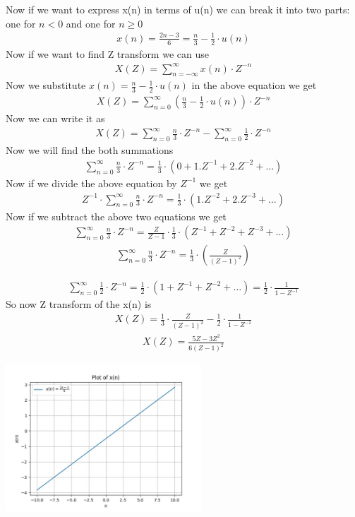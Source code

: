 \documentclass[journal,12pt,twocolumn]{IEEEtran}
\theoremstyle{remark}
\begin{document}
Now if we want to express x(n) in terms of u(n) we can break it into two parts: one for $n < 0 $ and one for $ n \ge 0$  
\begin{align} x(n) = \frac{2n-3}{6} = \frac{n}{3} - \frac{1}{2} \cdot u(n) \end{align}
\bigskip
Now if we want to find Z transform we can use
\begin{align} X(Z) = \sum_{n = -\infty}^{\infty} x(n) \cdot Z^{-n} \end{align}
\bigskip
Now we substitute 
$x(n) = \frac{n}{3} - \frac{1}{2} \cdot u(n)$ in the above equation we get
\begin{align} X(Z) = \sum_{n = 0}^{\infty} (\frac{n}{3} - \frac{1}{2} \cdot u(n) )\cdot Z^{-n} \end{align}
\bigskip
Now we can write it as 
\begin{align} X(Z) = \sum_{n=0}^{\infty} \frac{n}{3} \cdot Z^{-n} - \sum_{n=0}^{\infty} \frac{1}{2} \cdot Z^{-n} \end{align}
\bigskip
Now we will find the both summations 
\begin{align} \sum_{n=0}^{\infty} \frac{n}{3} \cdot Z^{-n} = \frac{1}{3} \cdot (0 + 1.Z^{-1} + 2.Z^{-2} + \ldots) \end{align}
\bigskip
Now if we divide the above equation by $Z^{-1}$ we get 
\begin{align} Z^{-1} \cdot \sum_{n=0}^{\infty} \frac{n}{3} \cdot Z^{-n} =\frac{1}{3} \cdot (1.Z^{-2} + 2.Z^{-3} + \ldots ) \end{align}
\bigskip
Now if we subtract the above two equations we get 
\begin{align} \sum_{n=0}^{\infty} \frac{n}{3} \cdot Z^{-n} = \frac{Z}{Z-1} \cdot \frac{1}{3} \cdot (Z^{-1} + Z^{-2} + Z^{-3} + \ldots) \end{align}
\begin{align} \sum_{n=0}^{\infty} \frac{n}{3} \cdot Z^{-n} = \frac{1}{3} \cdot \left(\frac{Z}{(Z-1)^{2}}\right) \end{align}
\newpage

\begin{align} \sum_{n=0}^{\infty} \frac{1}{2} \cdot Z^{-n} = \frac{1}{2} \cdot (1+Z^{-1} + Z^{-2} + \ldots) = \frac{1}{2} \cdot \frac{1}{1- Z^{-1}} \end{align}
So now Z transform of the x(n) is 
\begin{align} X(Z) = \frac{1}{3} \cdot \frac{Z}{(Z-1)^{2}} - \frac{1}{2} \cdot \frac{1}{1-Z^{-1}} \end{align}
\begin{align} X(Z) = {\frac{5Z-3 Z^{2}}{6(Z-1)^{2}}} \end{align}

\includegraphics[width=0.55\textwidth]{figs/graphgvv1.jpg}
\end{document}
